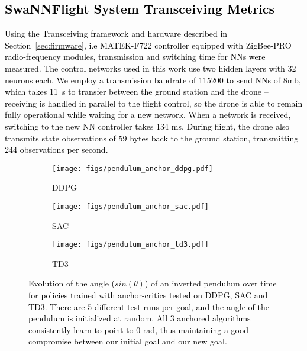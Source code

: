 \documentclass[letterpaper, 10 pt, conference]{ieeeconf} %
\newcommand{\firmware}{SwaNNFlight}
\newcommand{\rev}[1]{\textcolor{black}{#1}}
\begin{document}





\clearpage
\newpage
\appendix

\subsection{\rev{\firmware{} System Transceiving Metrics}}\label{A:comms_metrics}
        \rev{
        Using the Transceiving framework and hardware described in Section~\ref{sec:firmware}, i.e MATEK-F722 controller equipped with ZigBee\textsuperscript{\circledR}-PRO  radio-frequency modules, transmission and switching time for NNs were measured.
        The control networks used in this work use two hidden layers with 32 neurons each.
        We employ a transmission baudrate of 115200 to send NNs of 8mb, which takes 11~s to transfer between the ground station and the drone -- receiving is handled in parallel to the flight control, so the drone is able to remain fully operational while waiting for a new network.
        When a network is received, switching to the new NN controller takes 134 ms.
        During flight, the drone also transmits state observations of 59 bytes back to the ground station, transmitting 244 observations per second.
        }
        
    \begin{figure*}[t]
        \centering
        \begin{subfigure}[h]{0.32\textwidth}
            \centering
            \texttt{[image: figs/pendulum\_anchor\_ddpg.pdf]}
            \caption{DDPG}
            \label{fig:pendulum_ddpg}
        \end{subfigure}
        \begin{subfigure}[h]{0.32\textwidth}
            \centering
            \texttt{[image: figs/pendulum\_anchor\_sac.pdf]}
            \caption{SAC}
            \label{fig:pendulum_sac}
        \end{subfigure}
        \begin{subfigure}[h]{0.32\textwidth}
            \centering
            \texttt{[image: figs/pendulum\_anchor\_td3.pdf]}
            \caption{TD3}
            \label{fig:pendulum_td3}
        \end{subfigure}
        \caption{\rev{Evolution of the angle ($sin(\theta)$) of an inverted pendulum over time for policies trained with anchor-critics tested on DDPG, SAC and TD3.
        There are 5 different test runs per goal, and the angle of the pendulum is initialized at random.
        All 3 anchored algorithms consistently learn to point to 0 rad, thus maintaining a good compromise between our initial goal and our new goal.}}
        \label{fig:pendulum_all}
    \end{figure*}    
    
\end{document}
